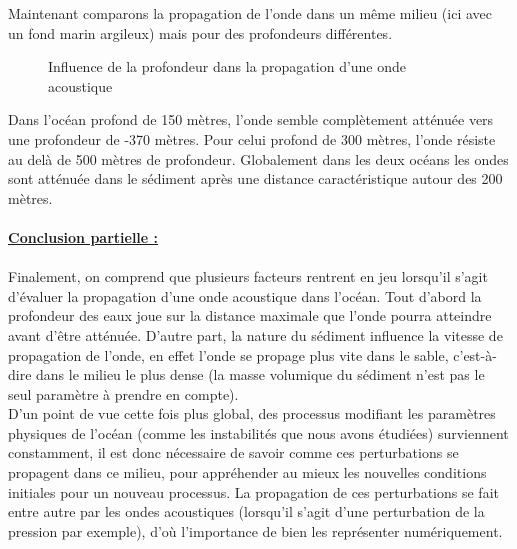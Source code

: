 \documentclass{rapportECC}
\begin{document}
Maintenant comparons la propagation de l'onde dans un même milieu (ici avec un fond marin argileux) mais pour des profondeurs différentes. 

\begin{figure}[H]
    \centering
    \label{fig:image1}\hfill
    \caption{Influence de la profondeur dans la propagation d'une onde acoustique}
    \label{fig:images_cote_a_cote}
\end{figure}
Dans l'océan profond de 150 mètres, l'onde semble complètement atténuée vers une profondeur de -370 mètres. Pour celui profond de 300 mètres, l'onde résiste au delà de 500 mètres de profondeur. Globalement dans les deux océans les ondes sont atténuée dans le sédiment après une distance caractéristique autour des 200 mètres. \\
\\
\underline{\textbf{Conclusion partielle :}} \\
\\
Finalement, on comprend que plusieurs facteurs rentrent en jeu lorsqu'il s'agit d'évaluer la propagation d'une onde acoustique dans l'océan. Tout d'abord la profondeur des eaux joue sur la distance maximale que l'onde pourra atteindre avant d'être atténuée. D'autre part, la nature du sédiment influence la vitesse de propagation de l'onde, en effet l'onde se propage plus vite dans le sable, c'est-à-dire dans le milieu le plus dense (la masse volumique du sédiment n'est pas le seul paramètre à prendre en compte).\\
D'un point de vue cette fois plus global, des processus modifiant les paramètres physiques de l'océan (comme les instabilités que nous avons étudiées) surviennent constamment, il est donc nécessaire de savoir comme ces perturbations se propagent dans ce milieu, pour appréhender au mieux les nouvelles conditions initiales pour un nouveau processus. La propagation de ces perturbations se fait entre autre par les ondes acoustiques (lorsqu'il s'agit d'une perturbation de la pression par exemple), d'où l'importance de bien les représenter numériquement.
\end{document}
